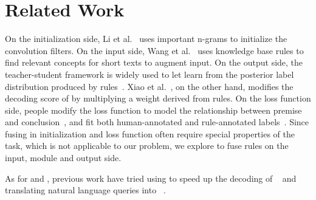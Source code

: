 \section{Related Work}

On the initialization side, Li et al.~ uses important n-grams to initialize the convolution filters. 
On the input side, Wang et al.~ uses knowledge base rules to find relevant concepts for short texts to augment input.
On the output side, the teacher-student framework is widely used to let \NN learn from the posterior label distribution produced by \FOL rules~\cite{hu2016harnessing,hu2016deep,guo2017knowledge}.
Xiao et al.~, on the other hand, modifies the decoding score of \NN by multiplying a weight derived from rules.
On the loss function side, people modify the loss function to model the relationship between premise and conclusion~\cite{demeester2016lifted}, and fit both human-annotated and rule-annotated labels~\cite{alashkar2017examples}.
Since fusing in initialization and loss function often require special properties of the task, which is not applicable to our problem, we explore to fuse \RE rules on the input, \NN module and output side.   

As for \NN and \RE, previous work have tried using \RE to speed up the decoding of \NN~\cite{strauss2016regular} and translating natural language queries into \REs~\cite{locascio2016neural}.

